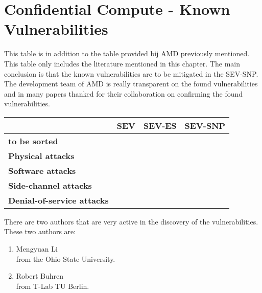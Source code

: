 
\section*{Confidential Compute - Known Vulnerabilities}


This table is in addition to the table provided bij AMD previously mentioned.
This table only includes the literature mentioned in this chapter. 
The main conclusion is that the known vulnerabilities 
are to be mitigated in the SEV-SNP. 
The development team of AMD is really transparent on the found vulnerabilities 
and in many papers thanked for their collaboration 
on confirming the found vulnerabilities. 

\begin{tabular}{ |l|c|c|c| }
   & \textbf{SEV} & \textbf{SEV-ES} & \textbf{SEV-SNP}\\
  \hline

  \textbf{to be sorted} 
  & \cite{hetzelt_security_2017,du_secure_2017,li_tlb_2021}
  & \cite{li_tlb_2021} 
  & \\

  \textbf{Physical attacks} 
  & \cite{li_exploiting_2019,buhren_insecure_2019,buhren_one_2021} 
  & \cite{wilke_sevurity_2020,buhren_one_2021} 
  & \cite{buhren_one_2021}\\

  \textbf{Software attacks} 
  & \cite{morbitzer_severed_2018,hetzelt_via_2021}
  & \cite{hetzelt_via_2021} 
  & \\

  \textbf{Side-channel attacks} 
  & \cite{li_crossline_2021,li_cipherleaks_2021,mestas_exploitation_2021} 
  & \cite{li_crossline_2021,li_cipherleaks_2021,mestas_exploitation_2021} 
  & \\

  \textbf{Denial-of-service attacks} & & & \\

\end{tabular}

There are two authors that are very active in the discovery of the vulnerabilities. 
These two authors are: 
\begin{enumerate}
  \item Mengyuan Li \\
  from the Ohio State University.  
  \item Robert Buhren \\
  from T-Lab TU  Berlin.
\end{enumerate}
